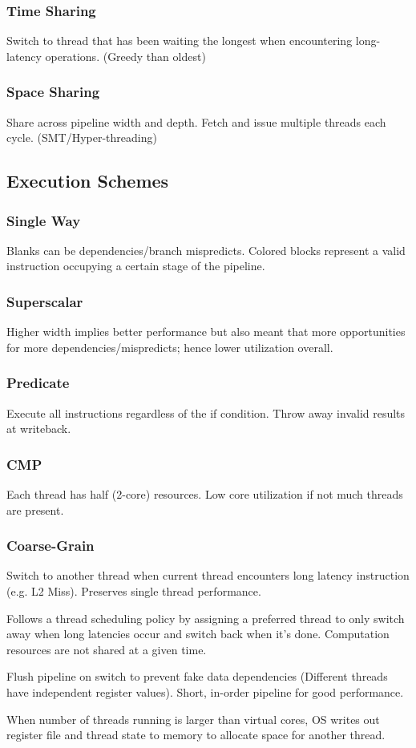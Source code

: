 \documentclass{article}
\begin{document}
\begin{multicols*}{2}
\subsubsection*{Time Sharing}
Switch to thread that has been waiting the longest when encountering long-latency operations. (Greedy than oldest)
\subsubsection*{Space Sharing}
Share across pipeline width and depth. Fetch and issue multiple threads each cycle. (SMT/Hyper-threading)

\subsection*{Execution Schemes}
\subsubsection*{Single Way}
Blanks can be dependencies/branch mispredicts. Colored blocks represent a valid instruction occupying a certain stage of the pipeline.

\subsubsection*{Superscalar}
Higher width implies better performance but also meant that more opportunities for more dependencies/mispredicts; hence lower utilization overall.

\subsubsection*{Predicate}
Execute all instructions regardless of the if condition. Throw away invalid results at writeback.

\subsubsection*{CMP}
Each thread has half (2-core) resources. Low core utilization if not much threads are present.

\subsubsection*{Coarse-Grain}
Switch to another thread when current thread encounters long latency instruction (e.g. L2 Miss). Preserves single thread performance. 
\medskip\par\noindent
Follows a thread scheduling policy by assigning a preferred thread to only switch away when long latencies occur and switch back when it's done. Computation resources are not shared at a given time.
\medskip\par\noindent
Flush pipeline on switch to prevent fake data dependencies (Different threads have independent register values). Short, in-order pipeline for good performance.
\medskip\par\noindent
When number of threads running is larger than virtual cores, OS writes out register file and thread state to memory to allocate space for another thread.


\end{multicols*}
\end{document}
